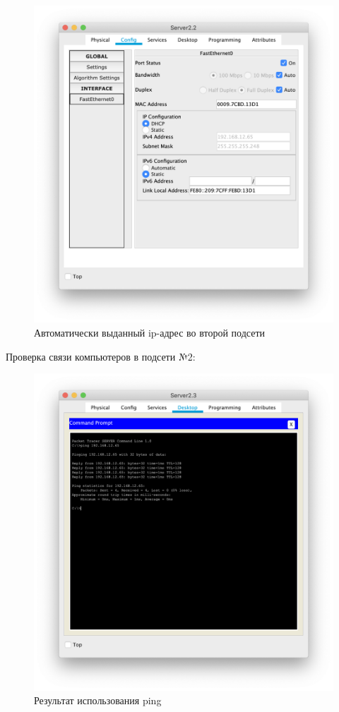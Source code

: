 \begin{figure}[H]
    \centering
    \includegraphics[width=0.7\linewidth]{images/net_2_machine.png}
    \caption{Автоматически выданный ip-адрес во второй подсети}%
\end{figure}


Проверка связи компьютеров в подсети №2:
\begin{figure}[H]
    \centering
    \includegraphics[width=0.8\linewidth]{images/net_2_ping.png}
    \caption{Результат использования ping}%
\end{figure}

